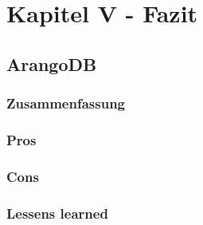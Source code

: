 \chapter{Kapitel V - Fazit}
\section{ArangoDB}

\subsection{Zusammenfassung}

\subsection{Pros}

\subsection{Cons}

\subsection{Lessens learned}

